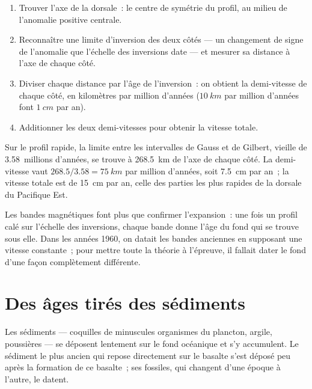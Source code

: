 
\begin{method}\label{met:g11:drift-to-spreading:rate}
\begin{enumerate}
  \item Trouver l'axe de la dorsale~: le centre de symétrie du profil, au
        milieu de l'anomalie positive centrale.
  \item Reconnaître une limite d'inversion des deux côtés --- un changement
        de signe de l'anomalie que l'échelle des inversions date --- et
        mesurer sa distance à l'axe de chaque côté.
  \item Diviser chaque distance par l'âge de l'inversion~: on obtient la
        demi-vitesse de chaque côté, en kilomètres par million d'années
        ($\qty{10}{km}$ par million d'années font $\qty{1}{cm}$ par an).
  \item Additionner les deux demi-vitesses pour obtenir la vitesse totale.
\end{enumerate}
\end{method}

\begin{example}\label{ex:g11:drift-to-spreading:fast}
Sur le profil rapide, la limite entre les intervalles de Gauss et de
Gilbert, vieille de \num{3.58}~millions d'années, se trouve à
\qty{268.5}{km} de l'axe de chaque côté. La demi-vitesse vaut
$268.5/3.58 = \qty{75}{km}$ par million d'années, soit \qty{7.5}{cm} par
an~; la vitesse totale est de \qty{15}{cm} par an, celle des parties les
plus rapides de la dorsale du Pacifique Est.
\end{example}

Les bandes magnétiques font plus que confirmer l'expansion~: une fois un
profil calé sur l'échelle des inversions, chaque bande donne l'âge du fond
qui se trouve sous elle. Dans les années 1960, on datait les bandes
anciennes en supposant une vitesse constante~; pour mettre toute la théorie
à l'épreuve, il fallait dater le fond d'une façon complètement différente.

\section{Des âges tirés des sédiments}

Les sédiments --- coquilles de minuscules organismes du plancton, argile,
poussières --- se déposent lentement sur le fond océanique et s'y
accumulent. Le sédiment le plus ancien qui repose directement sur le basalte
s'est déposé peu après la formation de ce basalte~; ses fossiles, qui
changent d'une époque à l'autre, le datent.

